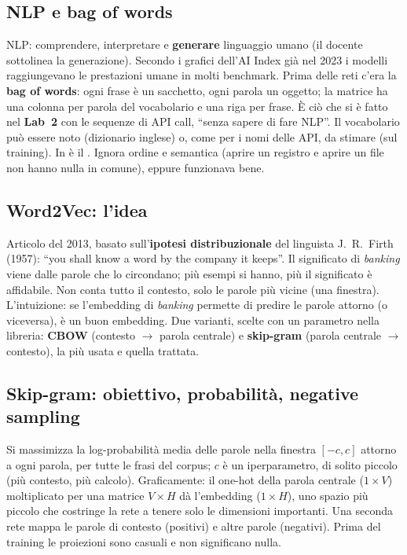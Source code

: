 \subsection{NLP e bag of words}
NLP: comprendere, interpretare e \textbf{generare} linguaggio umano (il docente sottolinea la generazione).
Secondo i grafici dell'AI Index già nel 2023 i modelli raggiungevano le prestazioni umane in molti benchmark.
Prima delle reti c'era la \textbf{bag of words}: ogni frase è un sacchetto, ogni parola un oggetto; la
matrice ha una colonna per parola del vocabolario e una riga per frase. È ciò che si è fatto nel
\textbf{Lab~2} con le sequenze di API call, ``senza sapere di fare NLP''. Il vocabolario può essere noto
(dizionario inglese) o, come per i nomi delle API, da stimare (sul training). In  è il
. Ignora ordine e semantica (aprire un registro e aprire un file non hanno nulla in
comune), eppure funzionava bene.

\subsection{Word2Vec: l'idea}
Articolo del 2013, basato sull'\textbf{ipotesi distribuzionale} del linguista J.~R.~Firth (1957): ``you shall
know a word by the company it keeps''. Il significato di \emph{banking} viene dalle parole che lo circondano;
più esempi si hanno, più il significato è affidabile. Non conta tutto il contesto, solo le parole più vicine
(una finestra). L'intuizione: se l'embedding di \emph{banking} permette di predire le parole attorno (o
viceversa), è un buon embedding. Due varianti, scelte con un parametro nella libreria: \textbf{CBOW}
(contesto $\to$ parola centrale) e \textbf{skip-gram} (parola centrale $\to$ contesto), la più usata e quella
trattata.

\subsection{Skip-gram: obiettivo, probabilità, negative sampling}
Si massimizza la log-probabilità media delle parole nella finestra $[-c, c]$ attorno a ogni parola, per tutte
le frasi del corpus; $c$ è un iperparametro, di solito piccolo (più contesto, più calcolo). Graficamente: il
one-hot della parola centrale ($1 \times V$) moltiplicato per una matrice $V \times H$ dà l'embedding
($1 \times H$), uno spazio più piccolo che costringe la rete a tenere solo le dimensioni importanti. Una
seconda rete mappa le parole di contesto (positivi) e altre parole (negativi). Prima del training le
proiezioni sono casuali e non significano nulla.

